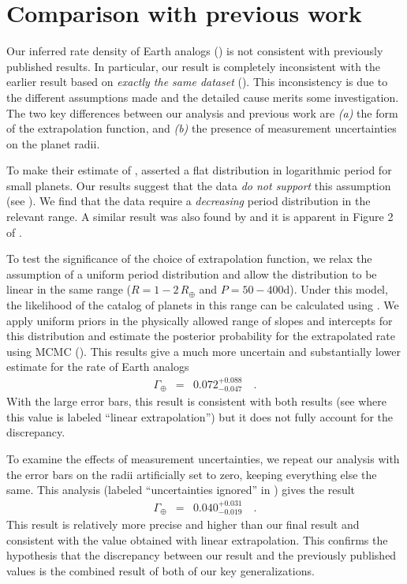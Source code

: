 \section{Comparison with previous work}

Our inferred rate density of Earth analogs () is not
consistent with previously published results.
In particular, our result is completely inconsistent with the earlier result
based on \emph{exactly the same dataset} (\citealt{Petigura:2013}).
This inconsistency is due to the different assumptions made and the detailed
cause merits some investigation.
The two key differences between our analysis and previous work are \emph{(a)}
the form of the extrapolation function, and \emph{(b)} the presence of
measurement uncertainties on the planet radii.

To make their estimate of \gammaearth, \citet{Petigura:2013} asserted a flat
distribution in logarithmic period for small planets.
Our results suggest that the data \emph{do not support} this assumption (see
).
We find that the data require a \emph{decreasing} period distribution in the
relevant range.
A similar result was also found by \citet{Dong:2013} and it is apparent in Figure 2
of \citet{Petigura:2013}.

To test the significance of the choice of extrapolation function, we relax the
assumption of a uniform period distribution and allow the distribution to be
linear in the same range ($R=1-2\,R_\oplus$ and $P=50-400\mathrm{d}$).
Under this model, the likelihood of the catalog of planets in this range can
be calculated using .
We apply uniform priors in the physically allowed range of slopes and
intercepts for this distribution and estimate the posterior probability for
the extrapolated rate using MCMC (\citealt{Foreman-Mackey:2013}).
This results give a much more uncertain and substantially lower estimate for
the rate of Earth analogs
\begin{eqnarray}
\Gamma_\oplus &=& 0.072^{+0.088}_{-0.047} \quad.
\end{eqnarray}
With the large error bars, this result is consistent with both results (see
 where this value is labeled ``linear extrapolation'') but it
does not fully account for the discrepancy.

To examine the effects of measurement uncertainties, we repeat our analysis
with the error bars on the radii artificially set to zero, keeping everything
else the same.
This analysis (labeled ``uncertainties ignored'' in ) gives
the result
\begin{eqnarray}
\Gamma_\oplus &=& 0.040^{+0.031}_{-0.019} \quad.
\end{eqnarray}
This result is relatively more precise and higher than our final result and
consistent with the value obtained with linear extrapolation.
This confirms the hypothesis that the discrepancy between our result and the
previously published values is the combined result of both of our key
generalizations.

